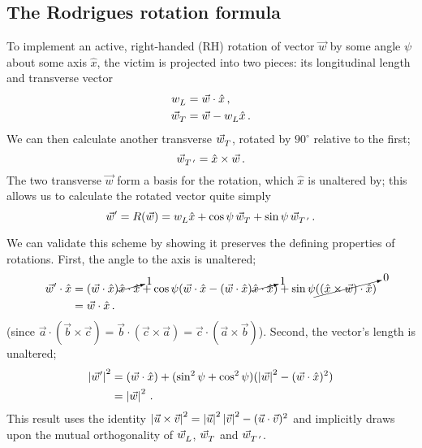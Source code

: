 \documentclass[12pt, nofootinbib, notitlepage]{revtex4}
\newcommand{\vecN}[1]{\hat{#1}}
\newcommand{\ang}{\psi}
\newcommand{\vict}{\vec{w}}
\newcommand{\ax}{\vecN{x}}
\begin{document}
\subsection{The Rodrigues rotation formula}%
%
To implement an active, right-handed (RH) rotation of vector $\vec{w}$
by some angle $\ang$ about some axis $\ax$,
the victim  is projected into two pieces:
its longitudinal length and transverse vector
\begin{align}
	w_L\ds & = \vict\cdot\ax\,,\label{eq:v_L}\\
	\vec{w}_T\ds & = \vict - w_L\ds \ax \label{eq:v_T}
	\,.
\end{align}
We can then calculate another transverse $\vec{w}_T^{}$, rotated by $90^\circ$ relative to the first;
\begin{equation}
	\vec{w}_{T^{\,\prime}}\ds = \ax\times\vict
	\,.
\end{equation}
The two transverse $\vec{w}$ form a basis for the rotation, 
which $\ax$ is unaltered by;
this allows us to calculate the rotated vector quite simply
\begin{equation}\label{eq:rot}
	\vict^\prime=R(\vict) = w_L\ds \ax + \cos\ang\, \vec{w}_T\ds + \sin\ang\,\vec{w}_{T^{\,\prime}}\ds
		\,.
\end{equation}

We can validate this scheme by showing it preserves %
the defining properties of rotations. 
First, the angle to the axis is unaltered;
\begin{align}
	\vict^\prime \cdot\ax
	& = (\vict\cdot\ax)\cancelto{1}{\ax\cdot\ax}
	  + \cos\ang(\vict\cdot\ax - (\vict\cdot\ax)\cancelto{1}{\ax\cdot\ax})	
	  + \sin\ang\cancelto{0}{((\ax\times\vict)\cdot\ax)}		\nonumber\\
	& = \vict\cdot\ax
	\,.
\end{align}
(since $\vec{a}\cdot(\vec{b}\times\vec{c}) 
	= \vec{b}\cdot(\vec{c}\times\vec{a}) 
	= \vec{c}\cdot(\vec{a}\times\vec{b})$).
Second, the vector's length is unaltered;
\begin{align}
	\abs{\vict^\prime}^2 
	  & = (\vict\cdot\ax) + (\sin^2\ang + \cos^2\ang)(\abs{\vict}^2 - (\vict\cdot\ax)^2)	\nonumber\\
	  & = \abs{\vict}^2
	  \,.
\end{align}
This result uses the identity 
$\left|\vec{u}\times\vec{v}\right|^2=\left|\vec{u}\right|^2\left|\vec{v}\right|^2 - (\vec{u}\cdot\vec{v})^2$ and
implicitly draws upon the mutual orthogonality of
$\vec{w}_L^{}$, $\vec{w}_T^{}$ and $\vec{w}_{T^{\,\prime}}^{}$.
\end{document}
